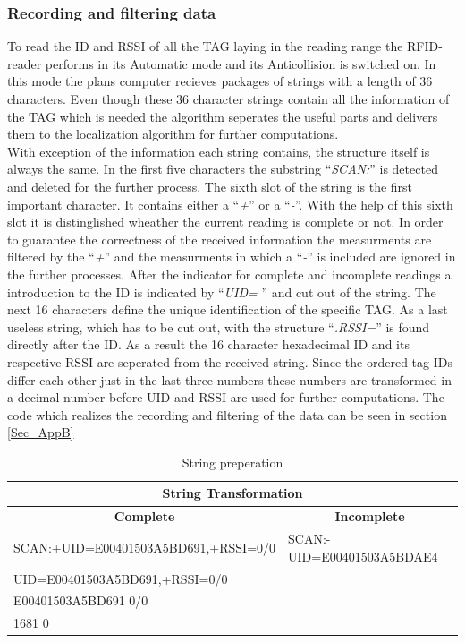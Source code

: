 \subsubsection{Recording and filtering data}
To read the ID and RSSI of all the TAG laying in the reading range the RFID-reader performs in its Automatic mode and its Anticollision is switched on. In this mode the plans computer recieves packages of strings with a length of 36 characters. Even though these 36 character strings contain all the information of the TAG which is needed the algorithm seperates the useful parts and delivers them to the localization algorithm for further computations.\\
With exception of the information each string contains, the structure itself is always the same. In the first five characters the substring ``\textit{SCAN:}'' is detected and deleted for the further process. The sixth slot of the string is the first important character. It contains either a ``\textit{+}'' or a ``\textit{-}''. With the help of this sixth slot it is distinglished wheather the current reading is complete or not. In order to guarantee the correctness of the received information the measurments are filtered by the ``\textit{+}'' and the measurments in which a ``\textit{-}'' is included are ignored in the further processes. After the indicator for complete and incomplete readings a introduction to the ID is indicated by  ``\textit{UID=} '' and cut out of the string. The next 16 characters define the unique identification of the specific TAG. As a last useless string, which has to be cut out, with the structure ``\textit{.RSSI=}'' is found directly after the ID. As a result the 16 character hexadecimal ID and its respective RSSI are seperated from the received string. Since the ordered tag IDs differ each other just in the last three numbers these numbers are transformed in a decimal number before UID and RSSI are used for further computations. The code which realizes the recording and filtering of the data can be seen in section \ref{Sec_AppB}\\
\begin{table}[!htbp]
\centering
\begin{tabular}{|l|l|}
\hline
\multicolumn{2}{|c|}{\textbf{String Transformation}}                               \\ \hline
\multicolumn{1}{|c|}{\textbf{Complete}} & \multicolumn{1}{c|}{\textbf{Incomplete}} \\ \hline
SCAN:+UID=E00401503A5BD691,+RSSI=0/0    & SCAN:-UID=E00401503A5BDAE4               \\ \hline
UID=E00401503A5BD691,+RSSI=0/0          &                                          \\ \hline
E00401503A5BD691 0/0                    &                                          \\ \hline
1681 0                                  &                                          \\ \hline
\end{tabular}
\caption{String preperation}
\label{string_prep}
\end{table}

